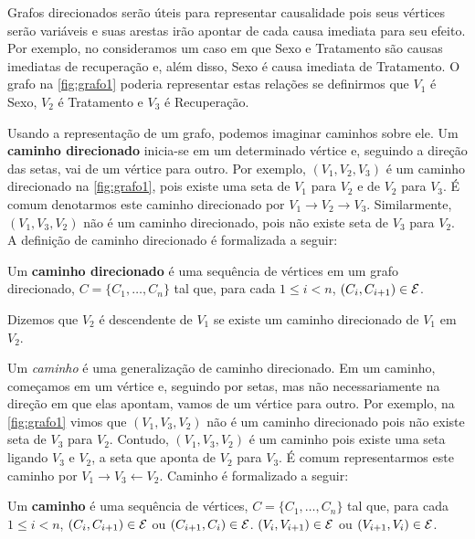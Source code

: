 Grafos direcionados serão úteis para 
representar causalidade pois 
seus vértices serão variáveis e
suas arestas irão apontar de 
cada causa imediata para seu efeito.
Por exemplo, no 
consideramos um caso em que Sexo e Tratamento são
causas imediatas de recuperação e, além disso,
Sexo é causa imediata de Tratamento.
O grafo na \cref{fig:grafo1} poderia
representar estas relações se definirmos que
$V_1$ é Sexo, $V_2$ é Tratamento e 
$V_3$ é Recuperação.

Usando a representação de um grafo,
podemos imaginar caminhos sobre ele.
Um \textbf{caminho direcionado} inicia-se 
em um determinado vértice e, 
seguindo a direção das setas, 
vai de um vértice para outro.
Por exemplo, $(V_1, V_2, V_3)$ é
um caminho direcionado na 
\cref{fig:grafo1}, pois existe
uma seta de $V_1$ para $V_2$ e
de $V_2$ para $V_3$.
É comum denotarmos este caminho direcionado por
$V_1 \rightarrow V_2 \rightarrow V_3$.
Similarmente, $(V_1, V_3, V_2)$ não é
um caminho direcionado, pois
não existe seta de $V_3$ para $V_2$.
A definição de caminho direcionado é
formalizada a seguir:

\begin{definition}
 \label{lem:caminhodir}
 Um \textbf{caminho direcionado} é 
 uma sequência de vértices em
 um grafo direcionado,
 $C = \{C_1, \ldots, C_n\}$ tal que, 
 para cada $1 \leq i < n$,
 $(C_i, C_{i+1}) \in {\mathcal E}$.
\end{definition}

\begin{definition}
 \label{def:descendente}
 Dizemos que $V_2$ é descendente de $V_1$ se
 existe um caminho direcionado de $V_1$ em $V_2$.
\end{definition}

Um \textit{caminho} é uma generalização 
de caminho direcionado.
Em um caminho, começamos em um vértice e,
seguindo por setas, mas 
não necessariamente na direção 
em que elas apontam, vamos
de um vértice para outro.
Por exemplo, na \cref{fig:grafo1}
vimos que $(V_1, V_3, V_2)$ não é um 
caminho direcionado pois não existe seta de $V_3$ para $V_2$.
Contudo, $(V_1, V_3, V_2)$ é um caminho pois
existe uma seta ligando $V_3$ e $V_2$,
a seta que aponta de $V_2$ para $V_3$.
É comum representarmos este caminho por
$V_1 \rightarrow V_3 \leftarrow V_2$.
Caminho é formalizado a seguir:

\begin{definition}
 \label{def:caminho}
 Um \textbf{caminho} é uma sequência de vértices,
 $C = \{C_1, \ldots, C_n\}$ tal que, 
 para cada $1 \leq i < n$,
 $(C_i, C_{i+1}) \in {\mathcal E}$ ou 
 $(C_{i+1}, C_{i}) \in {\mathcal E}$. 
 $(V_i, V_{i+1}) \in {\mathcal E}$ ou 
 $(V_{i+1}, V_{i}) \in {\mathcal E}$. 
\end{definition}

